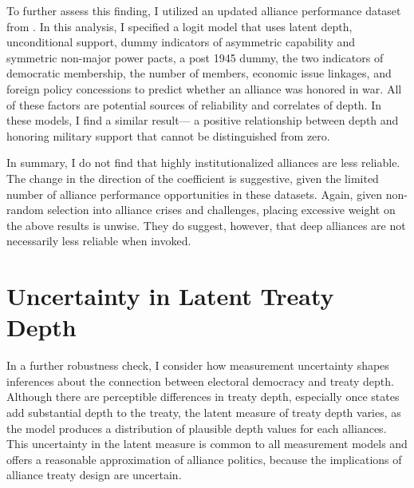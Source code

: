 \documentclass[12pt]{article}
\begin{document}
To further assess this finding, I utilized an updated alliance performance dataset from \citet{BerkemeierFuhrmann2018}.
In this analysis, I specified a logit model that uses latent depth, unconditional support, dummy indicators of asymmetric capability and symmetric non-major power pacts, a post 1945 dummy, the two indicators of democratic membership, the number of members, economic issue linkages, and foreign policy concessions to predict whether an alliance was honored in war. 
All of these factors are potential sources of reliability and correlates of depth. 
In these models, I find a similar result--- a positive relationship between depth and honoring military support that cannot be distinguished from zero.


In summary, I do not find that highly institutionalized alliances are less reliable. 
The change in the direction of the coefficient is suggestive, given the limited number of alliance performance opportunities in these datasets. 
Again, given non-random selection into alliance crises and challenges, placing excessive weight on the above results is unwise. 
They do suggest, however, that deep alliances are not necessarily less reliable when invoked. 



\section{Uncertainty in Latent Treaty Depth} 


In a further robustness check, I consider how measurement uncertainty shapes inferences about the connection between electoral democracy and treaty depth. 
Although there are perceptible differences in treaty depth, especially once states add substantial depth to the treaty, the latent measure of treaty depth varies, as the model produces a distribution of plausible depth values for each alliances. 
This uncertainty in the latent measure is common to all measurement models and offers a reasonable approximation of alliance politics, because the implications of alliance treaty design are uncertain.  
\end{document}

